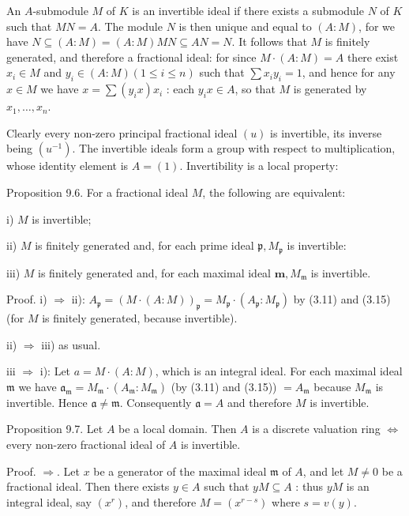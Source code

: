 \documentclass{standalone}
\theoremstyle{definition}
\theoremstyle{remark}
\begin{document}
An $A$-submodule $M$ of $K$ is an invertible ideal if there exists a submodule $N$ of $K$ such that $M N=A$. The module $N$ is then unique and equal to $(A: M)$, for we have $N \subseteq(A: M)=(A: M) M N \subseteq A N=N$. It follows that $M$ is finitely generated, and therefore a fractional ideal: for since $M \cdot(A: M)=A$ there exist $x_{i} \in M$ and $y_{i} \in(A: M)(1 \leqslant i \leqslant n)$ such that $\sum x_{i} y_{i}=1$, and hence for any $x \in M$ we have $x=\sum\left(y_{i} x\right) x_{i}$ : each $y_{i} x \in A$, so that $M$ is generated by $x_{1}, \ldots, x_{n}$.

Clearly every non-zero principal fractional ideal $(u)$ is invertible, its inverse being $\left(u^{-1}\right)$. The invertible ideals form a group with respect to multiplication, whose identity element is $A=(1)$. Invertibility is a local property:

Proposition 9.6. For a fractional ideal $M$, the following are equivalent:

i) $M$ is invertible;

ii) $M$ is finitely generated and, for each prime ideal $\mathfrak{p}, M_{\mathfrak{p}}$ is invertible:

iii) $M$ is finitely generated and, for each maximal ideal $\mathbf{m}, M_{\mathfrak{m}}$ is invertible.

Proof. i) $\Rightarrow$ ii): $A_{\mathfrak{p}}=(M \cdot(A: M))_{\mathfrak{p}}=M_{\mathfrak{p}} \cdot\left(A_{\mathfrak{p}}: M_{\mathfrak{p}}\right)$ by (3.11) and (3.15) (for $M$ is finitely generated, because invertible).

ii) $\Rightarrow$ iii) as usual.

iii $\Rightarrow$ i): Let $a=M \cdot(A: M)$, which is an integral ideal. For each maximal ideal $\mathfrak{m}$ we have $\mathfrak{a}_{\mathfrak{m}}=M_{\mathfrak{m}} \cdot\left(A_{\mathfrak{m}}: M_{\mathfrak{m}}\right)$ (by (3.11) and (3.15)) $=A_{\mathfrak{m}}$ because $M_{\mathfrak{m}}$ is invertible. Hence $\mathfrak{a} \neq \mathfrak{m}$. Consequently $\mathfrak{a}=A$ and therefore $M$ is invertible.

Proposition 9.7. Let $A$ be a local domain. Then $A$ is a discrete valuation ring $\Leftrightarrow$ every non-zero fractional ideal of $A$ is invertible.

Proof. $\Rightarrow$. Let $x$ be a generator of the maximal ideal $\mathfrak{m}$ of $A$, and let $M \neq 0$ be a fractional ideal. Then there exists $y \in A$ such that $y M \subseteq A$ : thus $y M$ is an integral ideal, say $\left(x^{r}\right)$, and therefore $M=\left(x^{r-s}\right)$ where $s=v(y)$.
\end{document}
